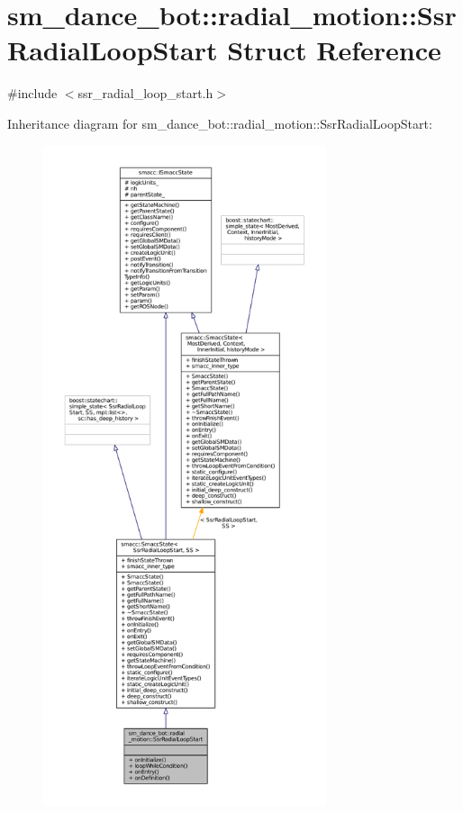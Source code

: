 \hypertarget{structsm__dance__bot_1_1radial__motion_1_1SsrRadialLoopStart}{}\section{sm\+\_\+dance\+\_\+bot\+:\+:radial\+\_\+motion\+:\+:Ssr\+Radial\+Loop\+Start Struct Reference}
\label{structsm__dance__bot_1_1radial__motion_1_1SsrRadialLoopStart}


{\ttfamily \#include $<$ssr\+\_\+radial\+\_\+loop\+\_\+start.\+h$>$}



Inheritance diagram for sm\+\_\+dance\+\_\+bot\+:\+:radial\+\_\+motion\+:\+:Ssr\+Radial\+Loop\+Start\+:
\nopagebreak
\begin{figure}[H]
\begin{center}
\leavevmode
\includegraphics[height=550pt]{structsm__dance__bot_1_1radial__motion_1_1SsrRadialLoopStart__inherit__graph}
\end{center}
\end{figure}


